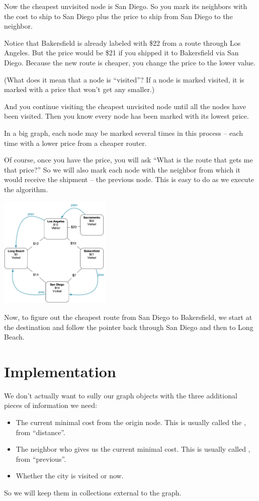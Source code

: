 Now the cheapest unvisited node is San Diego.  So you mark its
neighbors with the cost to ship to San Diego plus the price to ship
from San Diego to the neighbor.

Notice that Bakersfield is already labeled with \$22 from a route
through Los Angeles.  But the price would be \$21 if you shipped it to
Bakersfield via San Diego.  Because the new route is cheaper, you
change the price to the lower value.

(What does it mean that a node is ``visited''?  If a node is marked
visited, it is marked with a price that won't get any smaller.)

And you continue visiting the cheapest unvisited node until all the
nodes have been visited.  Then you know every node has been marked
with its lowest price.

In a big graph, each node may be marked several times in this process
-- each time with a lower price from a cheaper router.

Of course, once you have the price, you will ask ``What is the route
that gets me that price?''  So we will also mark each node with the
neighbor from which it would receive the shipment -- the previous
node.  This is easy to do as we execute the algorithm.

\includegraphics[width=0.4\textwidth]{prev.png}

Now, to figure out the cheapest route from San Diego to Bakersfield,
we start at the destination and follow the  pointer back
through San Diego and then to Long Beach.

\section{Implementation}

We don't actually want to sully our graph objects with the three additional pieces of information we need:
\begin{itemize}
\item The current minimal cost from the origin node. This is usually
  called the , from ``distance''.
\item The neighbor who gives us the current minimal cost. This is
  usually called , from ``previous''.
\item Whether the city is visited or now.
\end{itemize}
So we will keep them in collections external to the graph.

